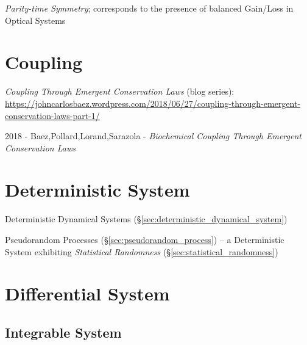 \emph{Parity-time Symmetry}; corresponds to the presence of balanced Gain/Loss
in Optical Systems



\section{Coupling}\label{sec:coupling}

\emph{Coupling Through Emergent Conservation Laws} (blog series):
\url{https://johncarlosbaez.wordpress.com/2018/06/27/coupling-through-emergent-conservation-laws-part-1/}

2018 - Baez,Pollard,Lorand,Sarazola -
\emph{Biochemical Coupling Through Emergent Conservation Laws}



\section{Deterministic System}\label{sec:deterministic_system}

\fist Deterministic Dynamical Systems
(\S\ref{sec:deterministic_dynamical_system})

\fist Pseudorandom Processes (\S\ref{sec:pseudorandom_process}) -- a
Deterministic System exhibiting \emph{Statistical Randomness}
(\S\ref{sec:statistical_randomness})



\section{Differential System}\label{sec:differential_system}




\subsection{Integrable System}\label{sec:integrable_system}

